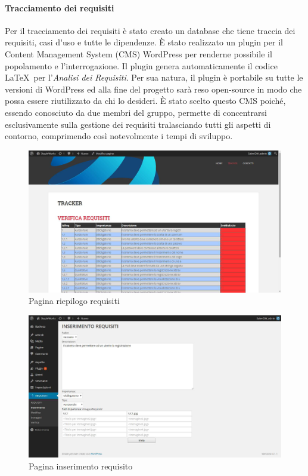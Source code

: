 \paragraph{Tracciamento dei requisiti}
Per il tracciamento dei requisiti è stato creato un \gls{database} che tiene traccia dei requisiti, \gls{casi d'uso} e tutte le dipendenze.
È stato realizzato un \gls{plugin} per il Content Management System (\gls{CMS}) \gls{WordPress} per renderne possibile il popolamento e l'interrogazione.
Il \gls{plugin} genera automaticamente il codice \LaTeX\ per l'\textit{Analisi dei Requisiti}.
Per sua natura, il \gls{plugin} è portabile su tutte le versioni di \gls{WordPress} ed alla fine del progetto sarà reso open-source in modo che possa essere riutilizzato da chi lo desideri. È stato scelto questo \gls{CMS} poiché, essendo conosciuto da due membri del gruppo, permette di concentrarsi esclusivamente sulla gestione dei requisiti tralasciando tutti gli aspetti di contorno, comprimendo così notevolmente i tempi di sviluppo.
\begin{figure}[h]
	\centering
	\includegraphics[width=0.7\linewidth]{img/tracker1}
	\caption[Pagina riepilogo requisiti]{Pagina riepilogo requisiti}
	\label{fig:tracker1}
\end{figure}
\begin{figure}[h]
	\centering
	\includegraphics[width=0.7\linewidth]{img/tracker2}
	\caption[Pagina inserimento requisito]{Pagina inserimento requisito}
	\label{fig:tracker2}
\end{figure}

